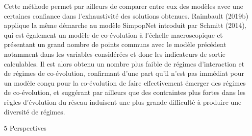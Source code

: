 \documentclass[10pt]{article}
\begin{document}
Cette méthode permet par ailleurs de comparer entre eux des modèles avec une certaines confiance dans l'exhaustivité des solutions obtenues. Raimbault (2019b) applique la même démarche au modèle SimpopNet introduit par Schmitt (2014), qui est également un modèle de co-évolution à l'échelle macroscopique et présentant un grand nombre de points communs avec le modèle précédent notamment dans les variables considérées et donc les indicateurs de sortie calculables. Il est alors obtenu un nombre plus faible de régimes d’interaction et de régimes de co-évolution, confirmant d’une part qu’il n’est pas immédiat pour un modèle conçu pour la co-évolution de faire effectivement émerger des régimes de co-évolution, et suggérant par ailleurs que des contraintes plus fortes dans les règles d'évolution du réseau induisent une plus grande difficulté à produire une diversité de régimes. 



5 Perspectives
\end{document}
